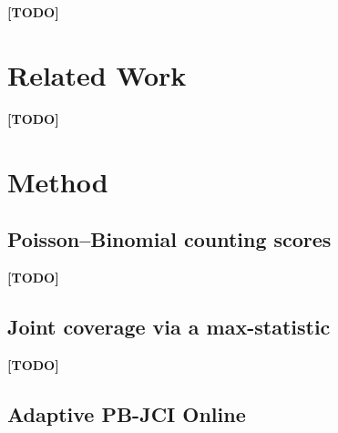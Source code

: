 \documentclass[pdflatex,sn-mathphys,Numbered]{sn-jnl}
\theoremstyle{remark}
\begin{document}
\textbf{[TODO]}

\section{Related Work}\label{sec:related}

\textbf{[TODO]}

\section{Method}\label{sec:method}

\subsection{Poisson--Binomial counting scores}\label{sec:pb}

\textbf{[TODO]}

\subsection{Joint coverage via a max-statistic}\label{sec:jci}

\textbf{[TODO]}

\subsection{Adaptive PB-JCI Online}\label{sec:adaptive}
\end{document}
